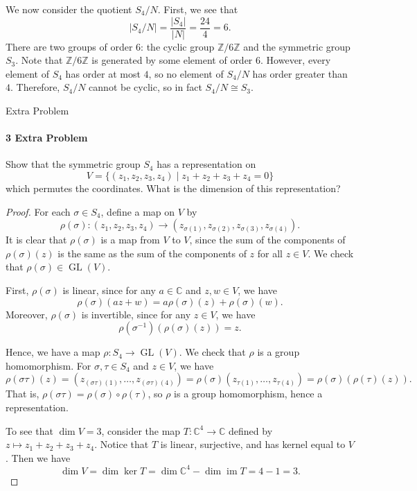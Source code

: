 \documentclass[12pt]{article}
\newlength{\myparskip}
\newenvironment{fullbox}{\begin{lrbox}{\savefullbox}\begin{minipage}{\dimexpr\textwidth-2\fboxsep\relax}\setlength{\parskip}{\myparskip}}{\end{minipage}\end{lrbox}\framebox[\textwidth]{\usebox{\savefullbox}}}
\newenvironment{pbox}[1][]{\begin{fullbox}\ifx#1\empty\else\paragraph{#1}\fi}{\end{fullbox}}
\newcommand{\Z}{\mathbb{Z}}
\newcommand{\C}{\mathbb{C}}
\newcommand{\<}{\langle}
\renewcommand{\>}{\rangle}
\newcommand{\isom}{\cong}
\theoremstyle{definition}
\DeclareMathOperator{\GL}{GL}
\DeclareMathOperator{\im}{im}
\begin{document}
We now consider the quotient $S_4 / N$. First, we see that
\[
    |S_4 / N| = \frac{|S_4|}{|N|} = \frac{24}{4} = 6.
\]
There are two groups of order $6$: the cyclic group $\Z/6\Z$ and the symmetric group $S_3$. Note that $\Z/6\Z$ is generated by some element of order $6$. However, every element of $S_4$ has order at most $4$, so no element of $S_4/N$ has order greater than $4$. Therefore, $S_4/N$ cannot be cyclic, so in fact $S_4/N \isom S_3$.



\newpage
\begin{pbox}[3 Extra Problem]
    Show that the symmetric group $S_4$ has a representation on 
    \[
        V = \{(z_1, z_2, z_3, z_4) \mid z_1 + z_2 + z_3 + z_4 = 0\}
    \]
    which permutes the coordinates. What is the dimension of this representation?
\end{pbox}

\begin{proof}
    For each $\sigma \in S_4$, define a map on $V$ by
    \[
        \rho(\sigma) : (z_1, z_2, z_3, z_4) \to (z_{\sigma(1)}, z_{\sigma(2)}, z_{\sigma(3)}, z_{\sigma(4)}).
    \]
    It is clear that $\rho(\sigma)$ is a map from $V$ to $V$, since the sum of the components of $\rho(\sigma)(z)$ is the same as the sum of the components of $z$ for all $z \in V$. We check that $\rho(\sigma) \in \GL(V)$.

    First, $\rho(\sigma)$ is linear, since for any $a \in \C$ and $z, w \in V$, we have
    \[
        \rho(\sigma)(az + w)
            = a\rho(\sigma)(z) + \rho(\sigma)(w).
    \]
    Moreover, $\rho(\sigma)$ is invertible, since for any $z \in V$, we have
    \[
        \rho(\sigma^{-1})(\rho(\sigma)(z)) = z.
    \]

    Hence, we have a map $\rho : S_4 \to \GL(V)$. We check that $\rho$ is a group homomorphism. For $\sigma, \tau \in S_4$ and $z \in V$, we have
    \[
        \rho(\sigma\tau)(z)
            = (z_{(\sigma\tau)(1)}, \dots, z_{(\sigma\tau)(4)})
            = \rho(\sigma)(z_{\tau(1)}, \dots, z_{\tau(4)})
            = \rho(\sigma)(\rho(\tau)(z)).
    \]
    That is, $\rho(\sigma\tau) = \rho(\sigma) \circ \rho(\tau)$, so $\rho$ is a group homomorphism, hence a representation.


    To see that $\dim V = 3$, consider the map $T : \C^4 \to \C$ defined by $z \mapsto z_1 + z_2 + z_3 + z_4$. Notice that $T$ is linear, surjective, and has kernel equal to $V$. Then we have
    \[
        \dim V = \dim \ker T = \dim \C^4 - \dim \im T = 4 - 1 = 3.
    \]
\end{proof}
\end{document}
